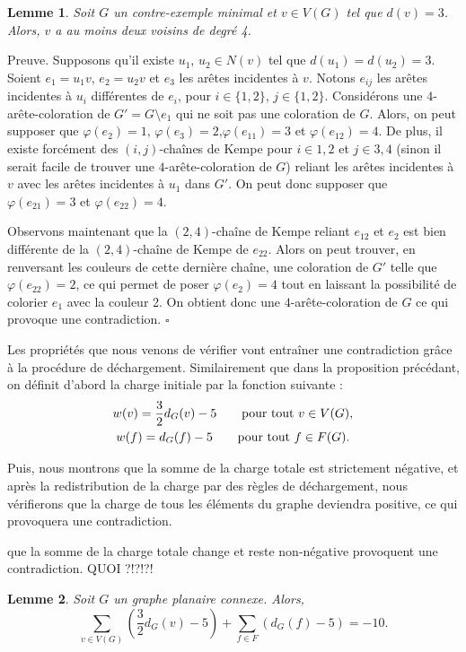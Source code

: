 \documentclass[10pt,a4paper]{article}
\newtheorem{lemme}{Lemme}
\newcommand{\ep}{{\hfill $\square$}}
\begin{document}
\begin{lemme}
Soit $G$ un contre-exemple minimal et $v \in V(G)$ tel que $d(v)=3$. Alors, $v$ a au moins deux voisins de degré 4.
\label{le:333}
\end{lemme}

Preuve.
Supposons qu'il existe $u_1$, $u_2 \in N(v)$ tel que $d(u_1) = d(u_2) = 3$. Soient $e_1 = u_1v$, $e_2 = u_2v$ et $e_3$ les arêtes incidentes à $v$. Notons $e_{ij}$ les arêtes incidentes à $u_i$ différentes de $e_i$, pour $i \in \{1,2\}$, $j \in \{1,2\}$. Considérons une $4$-arête-coloration de $G' = G \setminus e_1$ qui ne soit pas une coloration de $G$. Alors, on peut supposer que  $\varphi(e_2)=1$, $\varphi(e_3)=2$,$\varphi(e_{11})=3$ et $\varphi(e_{12})=4$. De plus, il existe forcément des $(i,j)$-chaînes de Kempe pour $i \in {1,2}$ et $j \in {3,4}$ (sinon il serait facile de trouver une $4$-arête-coloration de $G$) reliant les arêtes incidentes à $v$ avec les arêtes incidentes à $u_1$ dans $G'$. On peut donc supposer que $\varphi(e_{21})=3$ et $\varphi(e_{22})=4$.

Observons maintenant que la $(2,4)$-chaîne de Kempe reliant $e_{12}$ et $e_2$ est bien différente de la $(2,4)$-chaîne de Kempe de $e_{22}$. Alors on peut trouver, en renversant les couleurs de cette dernière chaîne, une coloration de $G'$ telle que $\varphi(e_{22}) = 2$, ce qui permet de poser $\varphi(e_2) = 4$ tout en laissant la possibilité de colorier $e_1$ avec la couleur 2. On obtient donc une $4$-arête-coloration de $G$ ce qui provoque une contradiction.
\ep

Les propriétés que nous venons de vérifier vont entraîner une contradiction grâce à la procédure de déchargement. Similairement que dans la proposition précédant, on définit d'abord la charge initiale par la fonction suivante :
$$
\gathered
w(v) = \frac{3}{2} d_G(v) - 5 \qquad \textrm{pour tout $v\in V(G)$,} \\
w(f) = d_G(f) - 5 \qquad \textrm{pour tout $f\in F(G)$.}
\endgathered
$$

Puis, nous montrons que la somme de la charge totale est strictement négative, et après la redistribution de la charge par des règles de déchargement, nous vérifierons que la charge de tous les éléments du graphe deviendra positive, ce qui provoquera une contradiction.

{\color{red} que la somme de la charge totale change et reste non-négative provoquent une contradiction.}{\color{blue} QUOI ?!?!?!}

\begin{lemme}
Soit $G$ un graphe planaire connexe. Alors,
$$ 
\sum_{v \in V(G)} \left(\frac{3}{2} d_G(v) - 5\right) + \sum_{f\in F} \left(d_G(f) -5\right) = -10.
$$
\label{le:cha2}
\end{lemme}
\end{document}
